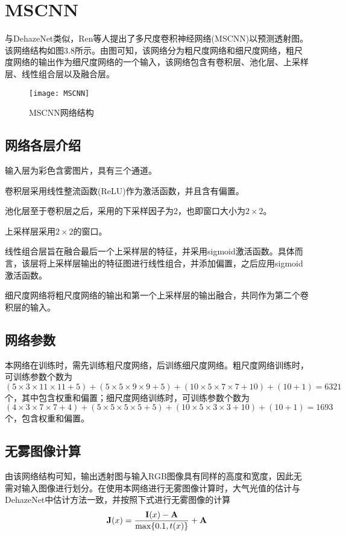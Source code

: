 \documentclass[a4paper, 12pt, oneside]{report}
\begin{document}
{\section{MSCNN\quad}
与DehazeNet类似，Ren\cite{ref17}等人提出了多尺度卷积神经网络(MSCNN)以预测透射图。该网络结构如图3.8所示。由图可知，该网络分为粗尺度网络和细尺度网络，粗尺度网络的输出作为细尺度网络的一个输入，该网络包含有卷积层、池化层、上采样层、线性组合层以及融合层。

\begin{figure}[H]
\centering
\texttt{[image: MSCNN]}
\caption{MSCNN网络结构}
\end{figure}

\subsection{网络各层介绍\quad}
	输入层为彩色含雾图片，具有三个通道。
\par 卷积层采用线性整流函数(ReLU)作为激活函数，并且含有偏置。
\par 池化层至于卷积层之后，采用的下采样因子为2，也即窗口大小为$2 \times 2$。
\par 上采样层采用$2 \times 2$的窗口。
\par 线性组合层旨在融合最后一个上采样层的特征，并采用sigmoid激活函数。具体而言，该层将上采样层输出的特征图进行线性组合，并添加偏置，之后应用sigmoid激活函数。
\par 细尺度网络将粗尺度网络的输出和第一个上采样层的输出融合，共同作为第二个卷积层的输入。

\subsection{网络参数\quad}
	本网络在训练时，需先训练粗尺度网络，后训练细尺度网络。粗尺度网络训练时，可训练参数个数为$(5 \times 3 \times 11 \times 11 + 5) + (5 \times 5 \times 9 \times 9 + 5) + (10 \times 5 \times 7 \times 7 + 10) + (10 + 1) = 6321$个，其中包含权重和偏置；细尺度网络训练时，可训练参数个数为$(4 \times 3 \times 7 \times 7 + 4) + (5 \times 5 \times 5 \times 5 + 5) + (10 \times 5 \times 3 \times 3 + 10) + (10 + 1) = 1693$个，包含权重和偏置。

\subsection{无雾图像计算\quad}
	由该网络结构可知，输出透射图与输入RGB图像具有同样的高度和宽度，因此无需对输入图像进行划分。在使用本网络进行无雾图像计算时，大气光值的估计与DehazeNet中估计方法一致，并按照下式进行无雾图像的计算
\begin{equation}
{\bf J}(x) = \frac{{\bf I}(x) - {\bf A}}{\max\{0.1, t(x)\}} + {\bf A}
\end{equation}

}
\end{document}

